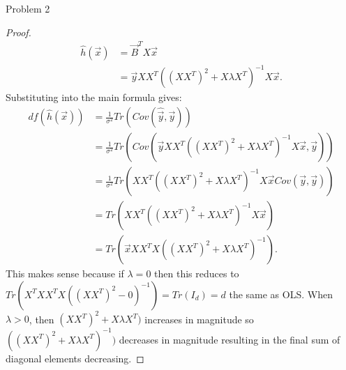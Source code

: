 \documentclass[a4paper]{article}
\begin{document}
\begin{note}{Problem 2}
\begin{enumerate}
\begin{proof}
\begin{align*}
          \hat{h}(\vec{x}) &= \vec{B}^T X \vec{x} \\
                           &= \vec{y} XX^T ((XX^T)^2 +  X \lambda X^T)^{-1} X \vec{x}
        .\end{align*}
        Substituting into the main formula gives:
        \begin{align*}
          df(\hat{h}(\vec{x})) &= \frac{1}{\sigma^2} Tr(Cov(\hat{\vec{y}}, \vec{y})) \\
                               &= \frac{1}{\sigma^2}  Tr(Cov(\vec{y} XX^T ((XX^T)^2 +  X \lambda X^T)^{-1} 
                               X \vec{x}, \vec{y})) \\
                               &= \frac{1}{\sigma^2} Tr(XX^T ((XX^T)^2 +  X \lambda X^T)^{-1} 
                               X \vec{x} Cov(\vec{y}, \vec{y})) \\
                               &= Tr(XX^T ((XX^T)^2 +  X \lambda X^T)^{-1}X \vec{x}) \\
                               &= Tr(\vec{x}XX^TX   ((XX^T)^2 +  X \lambda X^T)^{-1}) 
        .\end{align*}
        This makes sense because if $\lambda = 0$ then this reduces to $Tr(X^TXX^TX ((XX^T)^2 - 0)^{-1}) = Tr(I_d) = d$
        the same as OLS. When $\lambda > 0$, then $(XX^T)^2 +  X \lambda X^T)$ increases in magnitude so $((XX^T)^2 +  X \lambda X^T)^{-1})$  
        decreases in magnitude resulting in the final sum of diagonal elements decreasing.
      \end{proof}
  \end{enumerate}
\end{note}
\end{document}
